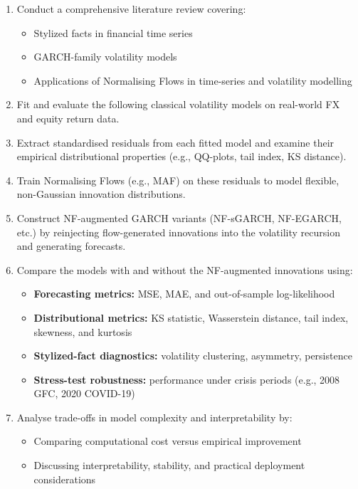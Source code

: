 \documentclass[oneside,12pt]{CUEDthesisPSnPDF}
\begin{document}
\begin{enumerate}
    \item Conduct a comprehensive literature review covering:
    \begin{itemize}
        \item Stylized facts in financial time series
        \item GARCH-family volatility models
        \item Applications of Normalising Flows in time-series and volatility modelling
    \end{itemize}

    \item Fit and evaluate the following classical volatility models on real-world FX and equity return data.

    \item Extract standardised residuals from each fitted model and examine their empirical distributional properties (e.g., QQ-plots, tail index, KS distance).

    \item Train Normalising Flows (e.g., MAF) on these residuals to model flexible, non-Gaussian innovation distributions.

    \item Construct NF-augmented GARCH variants (NF-sGARCH, NF-EGARCH, etc.) by reinjecting flow-generated innovations into the volatility recursion and generating forecasts.

    \item Compare the models with and without the NF-augmented innovations using:
    \begin{itemize}
        \item \textbf{Forecasting metrics:} MSE, MAE, and out-of-sample log-likelihood
        \item \textbf{Distributional metrics:} KS statistic, Wasserstein distance, tail index, skewness, and kurtosis
        \item \textbf{Stylized-fact diagnostics:} volatility clustering, asymmetry, persistence
        \item \textbf{Stress-test robustness:} performance under crisis periods (e.g., 2008 GFC, 2020 COVID-19)
    \end{itemize}

    \item Analyse trade-offs in model complexity and interpretability by:
    \begin{itemize}
        \item Comparing computational cost versus empirical improvement
        \item Discussing interpretability, stability, and practical deployment considerations
    \end{itemize}
\end{enumerate}
\end{document}
